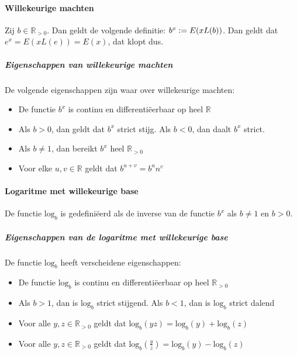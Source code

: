 \paragraph{Willekeurige machten} Zij $b\in\mathbb{R}_{>0}$. Dan geldt de volgende definitie: $b^{x}\vcentcolon= E(xL(b))$. Dan geldt dat $e^{x}=E(xL(e))=E(x)$, dat klopt dus.

\subparagraph{Eigenschappen van willekeurige machten} De volgende eigenschappen zijn waar over willekeurige machten:

\begin{itemize}
  \setlength\itemsep{0em}
  \item De functie $b^{x}$ is continu en differentiëerbaar op heel $\mathbb{R}$
  \item Als $b>0$, dan geldt dat $b^{x}$ strict stijg. Als $b<0$, dan daalt $b^{x}$ strict.
  \item Als $b\neq1$, dan bereikt $b^{x}$ heel $\mathbb{R}_{>0}$
  \item Voor elke $u,v\in\mathbb{R}$ geldt dat $b^{u+v}=b^{u}n^{v}$
\end{itemize}

\paragraph{Logaritme met willekeurige base} De functie $\text{log}_{b}$ is gedefiniëerd als de inverse van de functie $b^{x}$ als $b\neq1$ en $b>0$.

\subparagraph{Eigenschappen van de logaritme met willekeurige base} De functie $\text{log}_{b}$ heeft verscheidene eigenschappen:

\begin{itemize}
  \setlength\itemsep{0em}
  \item De functie $\text{log}_{b}$ is continu en differentiëerbaar op heel $\mathbb{R}_{>0}$
  \item Als $b>1$, dan is $\text{log}_{b}$ strict stijgend. Als $b<1$, dan is $\text{log}_{b}$ strict dalend
  \item Voor alle $y,z\in\mathbb{R}_{>0}$ geldt dat $\text{log}_{b}(yz)=\text{log}_{b}(y)+\text{log}_{b}(z)$
  \item Voor alle $y,z\in\mathbb{R}_{>0}$ geldt dat $\text{log}_{b}(\frac{y}{z})=\text{log}_{b}(y)-\text{log}_{b}(z)$
\end{itemize}
